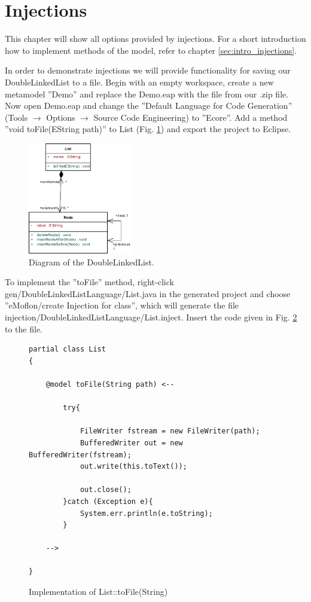 \section{Injections}
\label{sec:appendix_injections}

This chapter will show all options provided by injections. For a short introduction how to implement methods of the model, refer to chapter \ref{sec:intro_injections}.

In order to demonstrate injections we will provide functionality for saving our DoubleLinkedList to a file. Begin with an empty workspace, create a new metamodel ''Demo'' and replace the Demo.eap with the file from our .zip file. Now open Demo.eap and change the ''Default Language for Code Generation'' (Tools $\rightarrow$ Options $\rightarrow$ Source Code Engineering) to ''Ecore''. Add a method ''void toFile(EString path)'' to List (Fig. \ref{fig:append_inj_diagram}) and export the project to Eclipse.

\begin{figure}[htbp]
\begin{center}
  \includegraphics[width=0.4\textwidth]{pics/advancedTopics/injections/ea_diagram}
  \caption{Diagram of the DoubleLinkedList.}
  \label{fig:append_inj_diagram}
\end{center}
\end{figure}

To implement the ''toFile'' method, right-click gen/DoubleLinkedListLanguage/List.java in the generated project and choose ''eMoflon/create Injection for class'', which will generate the file injection/DoubleLinkedListLanguage/List.inject. Insert the code given in Fig. \ref{code:list_toFile_impl} to the file.

    \begin{figure}[htbp]
        \centering
        \begin{lstlisting}[language=Injection]
partial class List
{

    @model toFile(String path) <--

        try{

            FileWriter fstream = new FileWriter(path);
            BufferedWriter out = new BufferedWriter(fstream);
            out.write(this.toText());

            out.close();
        }catch (Exception e){
            System.err.println(e.toString);
        }

    -->

}
        \end{lstlisting}
        \caption{Implementation of List::toFile(String)}
        \label{code:list_toFile_impl}
    \end{figure}

